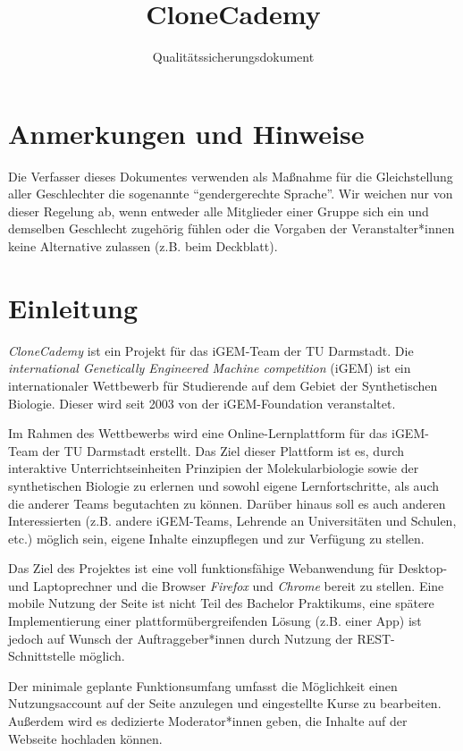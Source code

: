 \documentclass[accentcolor=tud0b,12pt,paper=a4]{tudreport}
\title{CloneCademy}
\subtitle{Qualitätssicherungsdokument}
\begin{document}
\maketitle
\tableofcontents

\chapter*{Anmerkungen und Hinweise}
Die Verfasser dieses Dokumentes verwenden als Maßnahme für die Gleichstellung aller Geschlechter die sogenannte "`gendergerechte Sprache"'. Wir weichen nur von dieser Regelung ab, wenn entweder alle Mitglieder einer Gruppe sich ein und demselben Geschlecht zugehörig fühlen oder die Vorgaben der Veranstalter*innen keine Alternative zulassen (z.B. beim Deckblatt).

\chapter{Einleitung}

\emph{CloneCademy} ist ein Projekt für das iGEM-Team der TU Darmstadt. Die \emph{international Genetically Engineered Machine competition} (iGEM) ist ein internationaler Wettbewerb für Studierende auf dem Gebiet der Synthetischen Biologie.
Dieser wird seit 2003 von der iGEM-Foundation veranstaltet.

Im Rahmen des Wettbewerbs wird eine Online-Lernplattform für das iGEM-Team der TU Darmstadt erstellt. Das Ziel dieser Plattform ist es, durch interaktive Unterrichtseinheiten Prinzipien der Molekularbiologie sowie der synthetischen Biologie zu erlernen und sowohl eigene Lernfortschritte, als auch die anderer Teams begutachten zu können. Darüber hinaus soll es auch anderen Interessierten (z.B. andere iGEM-Teams, Lehrende an Universitäten und Schulen, etc.) möglich sein, eigene Inhalte einzupflegen und zur Verfügung zu stellen.

Das Ziel des Projektes ist eine voll funktionsfähige Webanwendung für Desktop- und Laptoprechner und die Browser \emph{Firefox} und \emph{Chrome} bereit zu stellen. Eine mobile Nutzung der Seite ist nicht Teil des Bachelor Praktikums, eine spätere Implementierung einer plattformübergreifenden Lösung (z.B. einer App) ist jedoch auf Wunsch der Auftraggeber*innen durch Nutzung der REST-Schnittstelle möglich.

Der minimale geplante Funktionsumfang umfasst die Möglichkeit einen Nutzungsaccount auf der Seite anzulegen und eingestellte Kurse zu bearbeiten. Außerdem wird es dedizierte Moderator*innen geben, die Inhalte auf der Webseite hochladen können.
\end{document}

